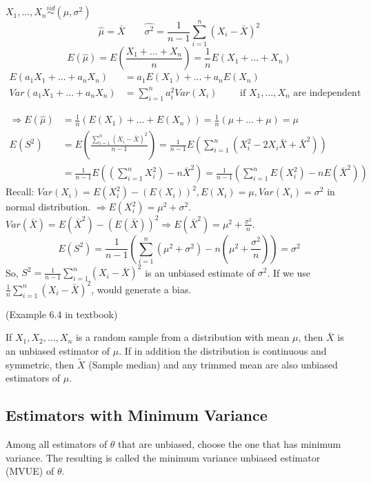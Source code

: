 \begin{exmp}
$X_1,\dots,X_n \overset{iid}{\sim} (\mu,\sigma^2)$
\[\hat{\mu}=\bar{X} \qquad \hat{\sigma^2}=\frac{1}{n-1}\sum_{i=1}^n(X_i-\bar{X})^2\]
\[E(\hat{\mu})=E(\frac{X_1+\dots+X_n}{n})=\frac{1}{n}E(X_1+\dots+X_n)\]
\begin{align*}
E(a_1 X_1+\dots+a_n X_n)&=a_1E(X_1)+\dots +a_n E(X_n)\\
Var(a_1 X_1+\dots+a_n X_n)&=\sum_{i=1}^n a_i^2 Var(X_i) \qquad \text{ if }X_1,\dots,X_n \text{ are independent  }  
\end{align*}

\begin{align*}
\Rightarrow E(\hat{\mu})&=\frac{1}{n}(E(X_1)+\dots+E(X_n))=\frac{1}{n}(\mu+\dots+\mu)=\mu \\
 E(S^2)&= E\left(\frac{\sum_{i=1}^n(X_i-\bar{X})^2}{n-1}\right)= \frac{1}{n-1} E\left(\sum_{i=1}^n (X_i^2 -2X_i \bar{X}+\bar{X}^2) \right) \\
 &= \frac{1}{n-1} E\left( \left(\sum_{i=1}^n X_i^2 \right) - n \bar{X}^2 \right) = \frac{1}{n-1} \left( \sum_{i=1}^n E ( X_i^2 ) - n E(\bar{X}^2) \right)
\end{align*}
Recall: $Var(X_i)=E(X_i^2)-(E(X_i))^2, E(X_i)=\mu, Var(X_i)=\sigma^2$ in normal distribution. $\Rightarrow E(X_i^2)=\mu^2+\sigma^2$. $Var(\bar{X})=E(\bar{X}^2)-(E(\bar{X}))^2 \Rightarrow E(\bar{X}^2)=\mu^2 +\frac{\sigma^2}{n}$.
\[E(S^2)=\frac{1}{n-1} \left( \sum_{i=1}^n (\mu^2+\sigma^2) - n \left(\mu^2 +\frac{\sigma^2}{n}\right) \right)=\sigma^2 \]
So, $S^2=\frac{1}{n-1}\sum_{i=1}^n(X_i-\bar{X})^2$ is an unbiased estimate of $\sigma^2$. If we use $\frac{1}{n}\sum_{i=1}^n(X_i-\bar{X})^2$, would generate a bias.
\end{exmp}

\begin{exmp}
(Example 6.4 in textbook)
\end{exmp}

\begin{prop}
If $X_1, X_2,\dots, X_n$ is a random sample from a distribution with mean $\mu$, then $\bar{X}$ is an unbiased estimator of $\mu$. If in addition the distribution is continuous and symmetric, then $\tilde{X}$ (Sample median) and any trimmed mean are also unbiased estimators of $\mu$.
\end{prop}

\subsection{Estimators with Minimum Variance}
\begin{mdframed}[style=exampledefault,frametitle={Principle of Minimum Variance Unbiased Estimation}]
Among all estimators of $\theta$ that are unbiased, choose the one that has minimum variance. 
The resulting is called the minimum variance unbiased estimator (MVUE) of $\theta$.
\end{mdframed}
%        

